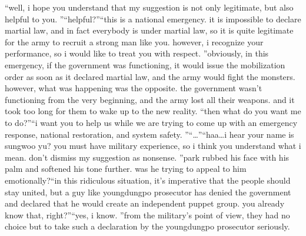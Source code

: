 “well, i hope you understand that my suggestion is not only legitimate, but also helpful to you.
”“helpful?”“this is a national emergency.
 it is impossible to declare martial law, and in fact everybody is under martial law, so it is quite legitimate for the army to recruit a strong man like you.
 however, i recognize your performance, so i would like to treat you with respect.
”obviously, in this emergency, if the government was functioning, it would issue the mobilization order as soon as it declared martial law, and the army would fight the monsters.
however, what was happening was the opposite.
 the government wasn’t functioning from the very beginning, and the army lost all their weapons.
 and it took too long for them to wake up to the new reality.
“then what do you want me to do?”“i want you to help us while we are trying to come up with an emergency response, national restoration, and system safety.
”“…”“haa…i hear your name is sungwoo yu? you must have military experience, so i think you understand what i mean.
 don’t dismiss my suggestion as nonsense.
”park rubbed his face with his palm and softened his tone further.
 was he trying to appeal to him emotionally?“in this ridiculous situation, it’s imperative that the people should stay united, but a guy like youngdungpo prosecutor has denied the government and declared that he would create an independent puppet group.
 you already know that, right?”“yes, i know.
”from the military’s point of view, they had no choice but to take such a declaration by the youngdungpo prosecutor seriously.


